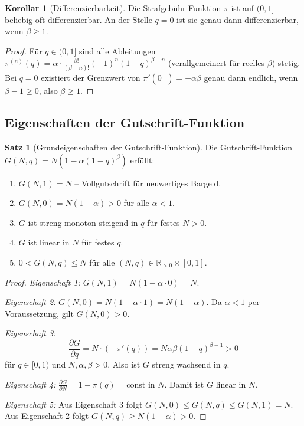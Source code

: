 ﻿\documentclass[a4paper,12pt]{article}
\theoremstyle{definition}
\newtheorem{satz}{Satz}
\newtheorem{korollar}{Korollar}
\begin{document}
\begin{korollar}[Differenzierbarkeit]
Die Strafgebühr-Funktion $\pi$ ist auf $(0,1]$ beliebig oft differenzierbar.
An der Stelle $q = 0$ ist sie genau dann differenzierbar, wenn $\beta \geq 1$.
\end{korollar}

\begin{proof}
Für $q \in (0,1]$ sind alle Ableitungen $\pi^{(n)}(q) = \alpha \cdot
\frac{\beta!}{(\beta-n)!}(-1)^n(1-q)^{\beta-n}$ (verallgemeinert für reelles $\beta$)
stetig.  Bei $q = 0$ existiert der Grenzwert von $\pi'(0^+) = -\alpha\beta$
genau dann endlich, wenn $\beta - 1 \geq 0$, also $\beta \geq 1$.
\end{proof}

\subsection{Eigenschaften der Gutschrift-Funktion}

\begin{satz}[Grundeigenschaften der Gutschrift-Funktion]
\label{satz:gutt}
Die Gutschrift-Funktion $G(N,q) = N(1 - \alpha(1-q)^{\beta})$ erfüllt:
\begin{enumerate}
  \item $G(N, 1) = N$ -- Vollgutschrift für neuwertiges Bargeld.
  \item $G(N, 0) = N(1-\alpha) > 0$ für alle $\alpha < 1$.
  \item $G$ ist streng monoton steigend in $q$ für festes $N > 0$.
  \item $G$ ist linear in $N$ für festes $q$.
  \item $0 < G(N,q) \leq N$ für alle $(N,q) \in \mathbb{R}_{>0} \times [0,1]$.
\end{enumerate}
\end{satz}

\begin{proof}
\emph{Eigenschaft 1:} $G(N,1) = N(1 - \alpha \cdot 0) = N$.

\emph{Eigenschaft 2:} $G(N,0) = N(1 - \alpha \cdot 1) = N(1-\alpha)$.
Da $\alpha < 1$ per Voraussetzung, gilt $G(N,0) > 0$.

\emph{Eigenschaft 3:}
\[
\frac{\partial G}{\partial q} = N \cdot (-\pi'(q)) = N \alpha \beta (1-q)^{\beta-1} > 0
\]
für $q \in [0,1)$ und $N, \alpha, \beta > 0$.  Also ist $G$ streng wachsend in $q$.

\emph{Eigenschaft 4:}
$\frac{\partial G}{\partial N} = 1 - \pi(q) = \text{const}$ in $N$.
Damit ist $G$ linear in $N$.

\emph{Eigenschaft 5:}
Aus Eigenschaft 3 folgt $G(N,0) \leq G(N,q) \leq G(N,1) = N$.
Aus Eigenschaft 2 folgt $G(N,q) \geq N(1-\alpha) > 0$.
\end{proof}
\end{document}
